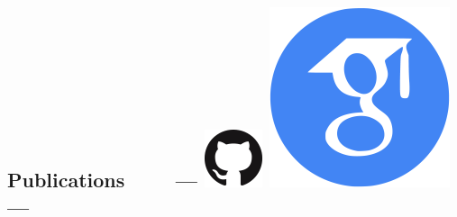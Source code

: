 \documentclass{article}
\begin{document}
\subsection*{Publications
	\ \ \ \ --- \protect
\href{https://github.com/quark0}{\includegraphics[natwidth=20, natheight=20]{img/GitHub-Mark-64px.png}}
\href{https://scholar.google.com/citations?user=IMkVH_8AAAAJ&hl=en}{\includegraphics[natwidth=20, natheight=20]{img/google-scholar.png}}
---
}
\end{document}

